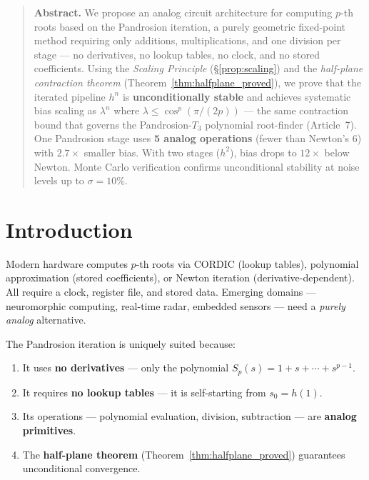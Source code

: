 \documentclass[10pt,a4paper,oneside]{book}
\theoremstyle{definition}
\theoremstyle{remark}
\newenvironment{abstract}{\begin{quote}\small\textbf{Abstract.}}{\end{quote}}
\begin{document}
\begin{abstract}
We propose an analog circuit architecture for computing $p$-th roots based on the Pandrosion iteration, a purely geometric fixed-point method requiring only additions, multiplications, and one division per stage --- no derivatives, no lookup tables, no clock, and no stored coefficients.  Using the \emph{Scaling Principle} (\S\ref{prop:scaling}) and the \emph{half-plane contraction theorem} (Theorem~\ref{thm:halfplane_proved}), we prove that the iterated pipeline $h^n$ is \textbf{unconditionally stable} and achieves systematic bias scaling as $\lambda^n$ where $\lambda \leq \cos^p(\pi/(2p))$ --- the same contraction bound that governs the Pandrosion-$T_3$ polynomial root-finder (Article~7).  One Pandrosion stage uses \textbf{5 analog operations} (fewer than Newton's 6) with $2.7\times$ smaller bias.  With two stages ($h^2$), bias drops to $12\times$ below Newton.  Monte Carlo verification confirms unconditional stability at noise levels up to $\sigma = 10\%$.
\end{abstract}

\section{Introduction}

Modern hardware computes $p$-th roots via CORDIC (lookup tables), polynomial approximation (stored coefficients), or Newton iteration (derivative-dependent).  All require a clock, register file, and stored data.  Emerging domains --- neuromorphic computing, real-time radar, embedded sensors --- need a \emph{purely analog} alternative.

The Pandrosion iteration is uniquely suited because:
\begin{enumerate}[nosep]
\item It uses \textbf{no derivatives} --- only the polynomial $S_p(s) = 1 + s + \cdots + s^{p-1}$.
\item It requires \textbf{no lookup tables} --- it is self-starting from $s_0 = h(1)$.
\item Its operations --- polynomial evaluation, division, subtraction --- are \textbf{analog primitives}.
\item The \textbf{half-plane theorem} (Theorem~\ref{thm:halfplane_proved}) guarantees unconditional convergence.
\end{enumerate}
\end{document}
